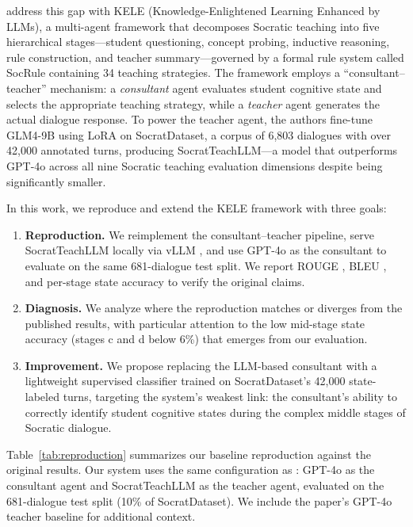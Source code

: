 \documentclass[11pt]{article}
\begin{document}
\citet{peng2025kele} address this gap with KELE (Knowledge-Enlightened Learning Enhanced by LLMs), a multi-agent framework that decomposes Socratic teaching into five hierarchical stages---student questioning, concept probing, inductive reasoning, rule construction, and teacher summary---governed by a formal rule system called SocRule containing 34 teaching strategies. The framework employs a ``consultant--teacher'' mechanism: a \emph{consultant} agent evaluates student cognitive state and selects the appropriate teaching strategy, while a \emph{teacher} agent generates the actual dialogue response. To power the teacher agent, the authors fine-tune GLM4-9B \citep{glm2024chatglm} using LoRA \citep{hu2022lora} on SocratDataset, a corpus of 6,803 dialogues with over 42,000 annotated turns, producing SocratTeachLLM---a model that outperforms GPT-4o across all nine Socratic teaching evaluation dimensions despite being significantly smaller.

In this work, we reproduce and extend the KELE framework with three goals:

\begin{enumerate}
    \item \textbf{Reproduction.} We reimplement the consultant--teacher pipeline, serve SocratTeachLLM locally via vLLM \citep{kwon2023vllm}, and use GPT-4o \citep{openai2024gpt4o} as the consultant to evaluate on the same 681-dialogue test split. We report ROUGE \citep{lin2004rouge}, BLEU \citep{papineni2002bleu}, and per-stage state accuracy to verify the original claims.
    \item \textbf{Diagnosis.} We analyze where the reproduction matches or diverges from the published results, with particular attention to the low mid-stage state accuracy (stages c and d below 6\%) that emerges from our evaluation.
    \item \textbf{Improvement.} We propose replacing the LLM-based consultant with a lightweight supervised classifier trained on SocratDataset's 42,000 state-labeled turns, targeting the system's weakest link: the consultant's ability to correctly identify student cognitive states during the complex middle stages of Socratic dialogue.
\end{enumerate}

Table~\ref{tab:reproduction} summarizes our baseline reproduction against the original results. Our system uses the same configuration as \citet{peng2025kele}: GPT-4o as the consultant agent and SocratTeachLLM as the teacher agent, evaluated on the 681-dialogue test split (10\% of SocratDataset). We include the paper's GPT-4o teacher baseline for additional context.
\end{document}
